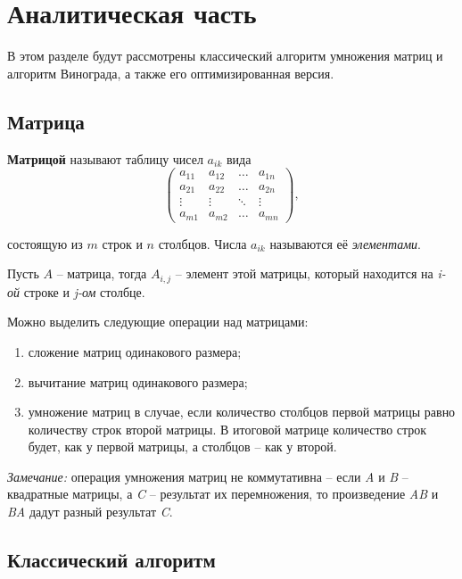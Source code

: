 \chapter{Аналитическая часть}

В этом разделе будут рассмотрены классический алгоритм умножения матриц и алгоритм Винограда, а также его оптимизированная версия.

\section{Матрица}

\textbf{Матрицой} \cite{book_matrix} называют таблицу чисел $a_{ik}$ вида
\begin{equation}
	\begin{pmatrix}
		a_{11} & a_{12} & \ldots & a_{1n}\\
		a_{21} & a_{22} & \ldots & a_{2n}\\
		\vdots & \vdots & \ddots & \vdots\\
		a_{m1} & a_{m2} & \ldots & a_{mn}
	\end{pmatrix},
\end{equation}

состоящую из $m$ строк и $n$ столбцов. Числа $a_{ik}$ называются её \textit{элементами}.

Пусть $A$ -- матрица, тогда $A_{i,j}$ -- элемент этой матрицы, который находится на \textit{i-ой} строке и \textit{j-ом} столбце.

Можно выделить следующие операции над матрицами:
\begin{enumerate}[label=\arabic*)]
	\item сложение матриц одинакового размера;
	\item вычитание матриц одинакового размера;
	\item умножение матриц в случае, если количество столбцов первой матрицы равно количеству строк второй матрицы. В итоговой матрице количество строк будет, как у первой матрицы, а столбцов -- как у второй. \newline
\end{enumerate}

\textit{Замечание:} операция умножения матриц не коммутативна -- если \textit{A} и \textit{B} -- квадратные матрицы, а \textit{C} -- результат их перемножения, то произведение \textit{AB} и \textit{BA} дадут разный результат \textit{C}.

\clearpage

\section{Классический алгоритм}

